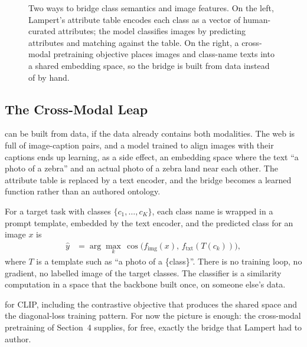 \begin{figure}
\caption{Two ways to bridge class semantics and image features. On the left, Lampert's attribute table encodes each class as a vector of human-curated attributes; the model classifies images by predicting attributes and matching against the table. On the right, a cross-modal pretraining objective places images and class-name texts into a shared embedding space, so the bridge is built from data instead of by hand.}
\label{fig:lampert_vs_crossmodal}
\end{figure}

\subsection{The Cross-Modal Leap}

 can be built from data, if the data already contains both modalities. The web is full of image-caption pairs, and a model trained to align images with their captions ends up learning, as a side effect, an embedding space where the text ``a photo of a zebra'' and an actual photo of a zebra land near each other. The attribute table is replaced by a text encoder, and the bridge becomes a learned function rather than an authored ontology.

 For a target task with classes $\{c_1, \ldots, c_K\}$, each class name is wrapped in a prompt template, embedded by the text encoder, and the predicted class for an image $x$ is
\begin{align*}
    \hat{y} &= \arg\max_{k} \, \cos\bigl(f_{\text{img}}(x),\, f_{\text{txt}}(T(c_k))\bigr),
\end{align*}
where $T$ is a template such as ``a photo of a \{class\}''. There is no training loop, no gradient, no labelled image of the target classes. The classifier is a similarity computation in a space that the backbone built once, on someone else's data.

 for CLIP, including the contrastive objective that produces the shared space and the diagonal-loss training pattern. For now the picture is enough: the cross-modal pretraining of Section~4 supplies, for free, exactly the bridge that Lampert had to author.

